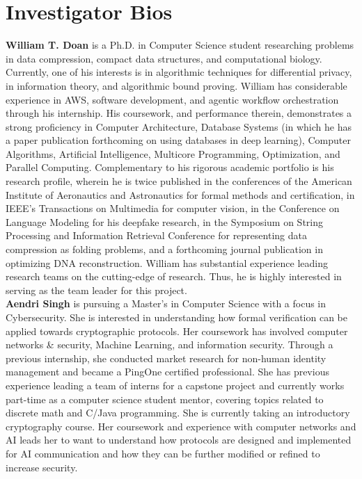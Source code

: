 \documentclass[11pt]{article}
\begin{document}
\section{Investigator Bios}
\textbf{William T. Doan} is a Ph.D. in Computer Science student researching problems in data compression, compact data structures, and computational biology. Currently, one of his interests is in algorithmic techniques for differential privacy, in information theory, and algorithmic bound proving. William has considerable experience in AWS, software development, and agentic workflow orchestration through his internship. His coursework, and performance therein, demonstrates a strong proficiency in Computer Architecture, Database Systems (in which he has a paper publication forthcoming on using databases in deep learning), Computer Algorithms, Artificial Intelligence, Multicore Programming, Optimization, and Parallel Computing. Complementary to his rigorous academic portfolio is his research profile, wherein he is twice published in the conferences of the American Institute of Aeronautics and Astronautics for formal methods and certification, in IEEE’s Transactions on Multimedia for computer vision, in the Conference on Language Modeling for his deepfake research, in the Symposium on String Processing and Information Retrieval Conference for representing data compression as folding problems, and a forthcoming journal publication in optimizing DNA reconstruction. William has substantial experience leading research teams on the cutting-edge of research. Thus, he is highly interested in serving as the team leader for this project.\\

\noindent
\textbf{Aendri Singh} is pursuing a Master’s in Computer Science with a focus in Cybersecurity. She is interested in understanding how formal verification can be applied towards cryptographic protocols. Her coursework has involved computer networks \& security, Machine Learning, and information security. Through a previous internship, she conducted market research for non-human identity management and became a PingOne certified professional. She has previous experience leading a team of interns for a capstone project and currently works part-time as a computer science student mentor, covering topics related to discrete math and C/Java programming. She is currently taking an introductory cryptography course. Her coursework and experience with computer networks and AI leads her to want to understand how protocols are designed and implemented for AI communication and how they can be further modified or refined to increase security.\\
\end{document}
